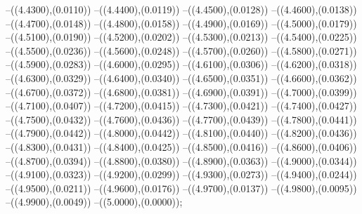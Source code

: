 {	--({\sx*(4.4300)},{\sy*(0.0110)})
	--({\sx*(4.4400)},{\sy*(0.0119)})
	--({\sx*(4.4500)},{\sy*(0.0128)})
	--({\sx*(4.4600)},{\sy*(0.0138)})
	--({\sx*(4.4700)},{\sy*(0.0148)})
	--({\sx*(4.4800)},{\sy*(0.0158)})
	--({\sx*(4.4900)},{\sy*(0.0169)})
	--({\sx*(4.5000)},{\sy*(0.0179)})
	--({\sx*(4.5100)},{\sy*(0.0190)})
	--({\sx*(4.5200)},{\sy*(0.0202)})
	--({\sx*(4.5300)},{\sy*(0.0213)})
	--({\sx*(4.5400)},{\sy*(0.0225)})
	--({\sx*(4.5500)},{\sy*(0.0236)})
	--({\sx*(4.5600)},{\sy*(0.0248)})
	--({\sx*(4.5700)},{\sy*(0.0260)})
	--({\sx*(4.5800)},{\sy*(0.0271)})
	--({\sx*(4.5900)},{\sy*(0.0283)})
	--({\sx*(4.6000)},{\sy*(0.0295)})
	--({\sx*(4.6100)},{\sy*(0.0306)})
	--({\sx*(4.6200)},{\sy*(0.0318)})
	--({\sx*(4.6300)},{\sy*(0.0329)})
	--({\sx*(4.6400)},{\sy*(0.0340)})
	--({\sx*(4.6500)},{\sy*(0.0351)})
	--({\sx*(4.6600)},{\sy*(0.0362)})
	--({\sx*(4.6700)},{\sy*(0.0372)})
	--({\sx*(4.6800)},{\sy*(0.0381)})
	--({\sx*(4.6900)},{\sy*(0.0391)})
	--({\sx*(4.7000)},{\sy*(0.0399)})
	--({\sx*(4.7100)},{\sy*(0.0407)})
	--({\sx*(4.7200)},{\sy*(0.0415)})
	--({\sx*(4.7300)},{\sy*(0.0421)})
	--({\sx*(4.7400)},{\sy*(0.0427)})
	--({\sx*(4.7500)},{\sy*(0.0432)})
	--({\sx*(4.7600)},{\sy*(0.0436)})
	--({\sx*(4.7700)},{\sy*(0.0439)})
	--({\sx*(4.7800)},{\sy*(0.0441)})
	--({\sx*(4.7900)},{\sy*(0.0442)})
	--({\sx*(4.8000)},{\sy*(0.0442)})
	--({\sx*(4.8100)},{\sy*(0.0440)})
	--({\sx*(4.8200)},{\sy*(0.0436)})
	--({\sx*(4.8300)},{\sy*(0.0431)})
	--({\sx*(4.8400)},{\sy*(0.0425)})
	--({\sx*(4.8500)},{\sy*(0.0416)})
	--({\sx*(4.8600)},{\sy*(0.0406)})
	--({\sx*(4.8700)},{\sy*(0.0394)})
	--({\sx*(4.8800)},{\sy*(0.0380)})
	--({\sx*(4.8900)},{\sy*(0.0363)})
	--({\sx*(4.9000)},{\sy*(0.0344)})
	--({\sx*(4.9100)},{\sy*(0.0323)})
	--({\sx*(4.9200)},{\sy*(0.0299)})
	--({\sx*(4.9300)},{\sy*(0.0273)})
	--({\sx*(4.9400)},{\sy*(0.0244)})
	--({\sx*(4.9500)},{\sy*(0.0211)})
	--({\sx*(4.9600)},{\sy*(0.0176)})
	--({\sx*(4.9700)},{\sy*(0.0137)})
	--({\sx*(4.9800)},{\sy*(0.0095)})
	--({\sx*(4.9900)},{\sy*(0.0049)})
	--({\sx*(5.0000)},{\sy*(0.0000)});
}
